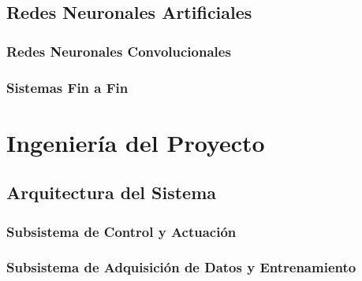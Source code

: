 \documentclass[]{beamer}
\begin{document}
        \subsection{Redes Neuronales Artificiales}
        \begin{frame}
        \end{frame}

            \subsubsection*{Redes Neuronales Convolucionales}
            \begin{frame}
            \end{frame}

            \subsubsection*{Sistemas Fin a Fin}
            \begin{frame}
            \end{frame}

    \section{Ingeniería del Proyecto}
        \subsection{Arquitectura del Sistema}
        \begin{frame}
        \end{frame}

            \subsubsection*{Subsistema de Control y Actuación}
            \begin{frame}
            \end{frame}

            \subsubsection*{Subsistema de Adquisición de Datos y Entrenamiento}
            \begin{frame}
            \end{frame}
            
\end{document}
